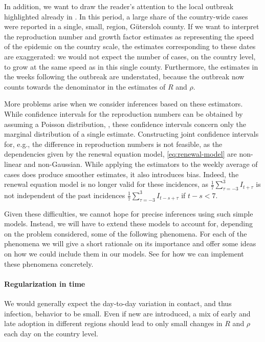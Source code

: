 In addition, we want to draw the reader's attention to the local outbreak highlighted already in . In this period, a large share of the country-wide cases were reported in a single, small, region, Gütersloh county. If we want to interpret the reproduction number and growth factor estimates as representing the speed of the epidemic on the country scale, the estimates corresponding to these dates are exaggerated: we would not expect the number of cases, on the country level, to grow at the same speed as in this single county. Furthermore, the estimates in the weeks following the outbreak are understated, because the outbreak now counts towards the denominator in the estimates of $R$ and $\rho$. 

More problems arise when we consider inferences based on these estimators. While confidence intervals for the reproduction numbers can be obtained by assuming a Poisson distribution, , these confidence intervals concern only the marginal distribution of a single estimate. Constructing joint confidence intervals for, e.g., the difference in reproduction numbers is not feasible, as the dependencies given by the renewal equation model, \eqref{eq:renewal-model} are non-linear and non-Gaussian. While applying the estimators to the weekly average of cases does produce smoother estimates, it also introduces bias. Indeed, the renewal equation model is no longer valid for these incidences, as $\frac{1}{7}\sum_{\tau = -3}^3 I_{t + \tau}$ is not independent of the past incidences $\frac{1}7 \sum_{\tau = -3 }^3 I_{t - s +\tau}$ if $t - s < 7$. 



Given these difficulties, we cannot hope for precise inferences using such simple models. Instead, we will have to extend these models to account for, depending on the problem considered, some of the following phenomena. For each of the phenomena we will give a short rationale on its importance and offer some ideas on how we could include them in our models. See  for how we can implement these phenomena concretely.

\paragraph{Regularization in time}
We would generally expect the day-to-day variation in contact, and thus infection, behavior to be small. Even if new  are introduced, a mix of early and late adoption in different regions should lead to only small changes in $R$ and $\rho$ each day on the country level. 

